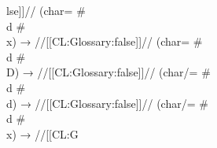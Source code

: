 lse]]// (char= #\\d #\\x) → //[[CL:Glossary:false]]// (char= #\\d #\\D) → //[[CL:Glossary:false]]// (char/= #\\d #\\d) → //[[CL:Glossary:false]]// (char/= #\\d #\\x) → //[[CL:G